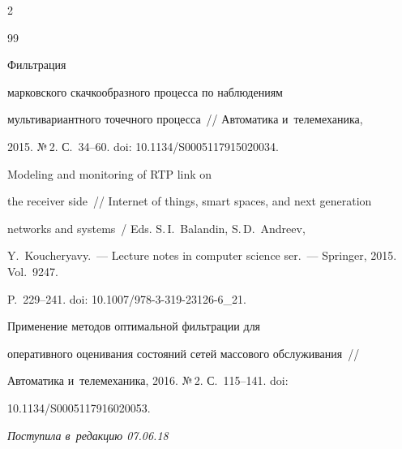 \begin{multicols}{2}
{{\begin{thebibliography}{99}


 Фильт\-ра\-ция 


марковского скачкообразного процесса по наблюдениям 


мультивариантного точечного процесса~// Автоматика и~телемеханика, 


2015. №\,2. С.~34--60. doi: 10.1134/S0005117915020034.




 Modeling and monitoring of RTP link on 


the receiver side~// Internet of things, smart spaces, and next generation


networks and systems~/ Eds. S.\,I.~Balandin, S.\,D.~Andreev,


Y.~Koucheryavy.~--- Lecture notes in computer science ser.~--- Springer, 2015. Vol.~9247. 


P.~229--241. doi: 10.1007/978-3-319-23126-6\_21.




 Применение методов оптимальной фильтрации для 


оперативного оценивания состояний сетей массового обслуживания~// 


Автоматика и~телемеханика, 2016. №\,2. С.~115--141. doi: 


10.1134/S0005117916020053.


 \end{thebibliography}





 }


 }





\end{multicols}





\vspace*{-3pt}





\hfill{\small\textit{Поступила в~редакцию 07.06.18}}





\vspace*{8pt}





